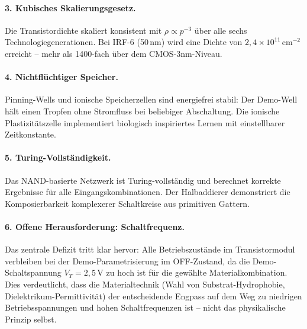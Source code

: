 ﻿\documentclass[a4paper,12pt]{scrreprt}
\theoremstyle{definition}
\begin{document}
\paragraph{3. Kubisches Skalierungsgesetz.}
Die Transistordichte skaliert konsistent mit $\rho \propto p^{-3}$ über
alle sechs Technologiegenerationen. Bei IRF-6 (50\,nm) wird eine Dichte
von $2{,}4 \times 10^{11}$\,cm$^{-2}$ erreicht -- mehr als 1400-fach über dem
CMOS-3nm-Niveau.

\paragraph{4. Nichtflüchtiger Speicher.}
Pinning-Wells und ionische Speicherzellen sind energiefrei stabil:
Der Demo-Well hält einen Tropfen ohne Stromfluss bei beliebiger Abschaltung.
Die ionische Plastizitätszelle implementiert biologisch inspiriertes Lernen
mit einstellbarer Zeitkonstante.

\paragraph{5. Turing-Vollständigkeit.}
Das NAND-basierte Netzwerk ist Turing-vollständig und berechnet korrekte
Ergebnisse für alle Eingangskombinationen. Der Halbaddierer demonstriert
die Komposierbarkeit komplexerer Schaltkreise aus primitiven Gattern.

\paragraph{6. Offene Herausforderung: Schaltfrequenz.}
Das zentrale Defizit tritt klar hervor: Alle Betriebszustände im
Transistormodul verbleiben bei der Demo-Parametrisierung im OFF-Zustand,
da die Demo-Schaltspannung $V_T = 2{,}5$\,V zu hoch ist für die
gewählte Materialkombination. Dies verdeutlicht, dass die Materialtechnik
(Wahl von Substrat-Hydrophobie, Dielektrikum-Permittivität) der
entscheidende Engpass auf dem Weg zu niedrigen Betriebsspannungen und
hohen Schaltfrequenzen ist -- nicht das physikalische Prinzip selbst.

\end{document}
